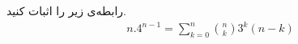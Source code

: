 \p
رابطه‌ی زیر را اثبات کنید.
        \begin{align*}
       n. 4^{n-1} = \sum\limits_{k=0}^{n} \binom{n}{k}3^k (n-k) 
        \end{align*}
